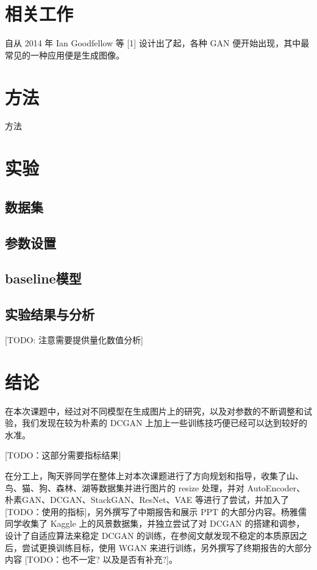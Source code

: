 \documentclass{article}
\begin{document}
\begin{CJK*}{UTF8}{gbsn}
\section{相关工作}

自从 2014 年 Ian Goodfellow 等 [1] 设计出了起，各种 GAN 便开始出现，其中最常见的一种应用便是生成图像。

\section{方法}

方法

\section{实验}

  \subsection{数据集}

  \subsection{参数设置}

  \subsection{baseline模型}

  \subsection{实验结果与分析}

  [TODO: 注意需要提供量化数值分析]

\section{结论}

在本次课题中，经过对不同模型在生成图片上的研究，以及对参数的不断调整和试验，我们发现在较为朴素的 DCGAN 上加上一些训练技巧便已经可以达到较好的水准。

[TODO：这部分需要指标结果]

在分工上，陶天骅同学在整体上对本次课题进行了方向规划和指导，收集了山、鸟、猫、狗、森林、湖等数据集并进行图片的 resize 处理，并对 AutoEncoder、朴素GAN、DCGAN、StackGAN、ResNet、VAE 等进行了尝试，并加入了 [TODO：使用的指标]，另外撰写了中期报告和展示 PPT 的大部分内容。杨雅儒同学收集了 Kaggle 上的风景数据集，并独立尝试了对 DCGAN 的搭建和调参，设计了自适应算法来稳定 DCGAN 的训练，在参阅文献发现不稳定的本质原因之后，尝试更换训练目标，使用 WGAN 来进行训练，另外撰写了终期报告的大部分内容 [TODO：也不一定? 以及是否有补充?]。


\end{CJK*}
\end{document}
